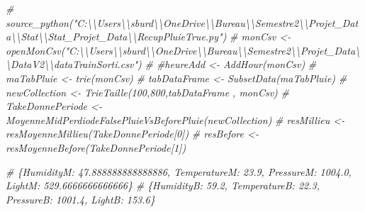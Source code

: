 \documentclass[
]{article}
\newenvironment{Shaded}{\begin{snugshade}}{\end{snugshade}}
\newcommand{\CommentTok}[1]{\textcolor[rgb]{0.56,0.35,0.01}{\textit{#1}}}
\begin{document}
\begin{Shaded}
\begin{Highlighting}[]
\CommentTok{\# source\_python("C:\textbackslash{}\textbackslash{}Users\textbackslash{}\textbackslash{}sburd\textbackslash{}\textbackslash{}OneDrive\textbackslash{}\textbackslash{}Bureau\textbackslash{}\textbackslash{}Semestre2\textbackslash{}\textbackslash{}Projet\_Data\textbackslash{}\textbackslash{}Stat\textbackslash{}\textbackslash{}Stat\_Projet\_Data\textbackslash{}\textbackslash{}RecupPluieTrue.py")}
\CommentTok{\# monCsv \textless{}{-} openMonCsv("C:\textbackslash{}\textbackslash{}Users\textbackslash{}\textbackslash{}sburd\textbackslash{}\textbackslash{}OneDrive\textbackslash{}\textbackslash{}Bureau\textbackslash{}\textbackslash{}Semestre2\textbackslash{}\textbackslash{}Projet\_Data\textbackslash{}\textbackslash{}DataV2\textbackslash{}\textbackslash{}dataTrainSorti.csv")}
\CommentTok{\# \#heureAdd \textless{}{-} AddHour(monCsv)}
\CommentTok{\# maTabPluie \textless{}{-} trie(monCsv)}
\CommentTok{\# tabDataFrame \textless{}{-} SubsetData(maTabPluie)}
\CommentTok{\# newCollection \textless{}{-} TrieTaille(100,800,tabDataFrame , monCsv)}
\CommentTok{\# TakeDonnePeriode \textless{}{-} MoyenneMidPerdiodeFalsePluieVsBeforePluie(newCollection)}
\CommentTok{\# resMillieu \textless{}{-} resMoyenneMillieu(TakeDonnePeriode[0])}
\CommentTok{\# resBefore \textless{}{-} resMoyenneBefore(TakeDonnePeriode[1])}


\CommentTok{\# \{\textquotesingle{}HumidityM\textquotesingle{}: 47.888888888888886, \textquotesingle{}TemperatureM\textquotesingle{}: 23.9, \textquotesingle{}PressureM\textquotesingle{}: 1004.0, \textquotesingle{}LightM\textquotesingle{}: 529.6666666666666\}}
\CommentTok{\# \{\textquotesingle{}HumidityB\textquotesingle{}: 59.2, \textquotesingle{}TemperatureB\textquotesingle{}: 22.3, \textquotesingle{}PressureB\textquotesingle{}: 1001.4, \textquotesingle{}LightB\textquotesingle{}: 153.6\}}


\end{Highlighting}
\end{Shaded}
\end{document}
